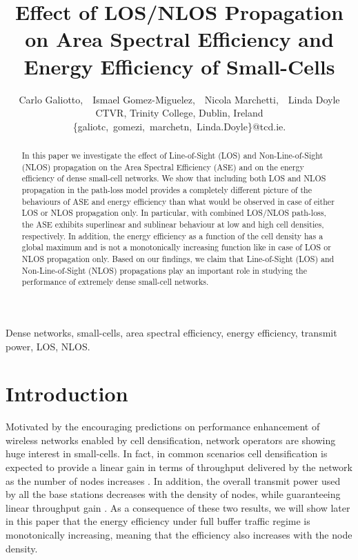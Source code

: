 \documentclass[twocoumn]{IEEEtran}
\title{Effect of LOS/NLOS Propagation on Area Spectral Efficiency and Energy Efficiency of Small-Cells}
\author{Carlo Galiotto,~~Ismael Gomez-Miguelez,~~Nicola Marchetti,~~Linda Doyle\\
CTVR, Trinity College, Dublin, Ireland \\ \{galiotc,~gomezi,~marchetn,~Linda.Doyle\}@tcd.ie.
}
\begin{document}
\maketitle
\begin{abstract}
In this paper we investigate the effect of Line-of-Sight (LOS) and Non-Line-of-Sight (NLOS) propagation on the Area Spectral Efficiency (ASE) and on the energy efficiency of dense small-cell networks.  
We show that including both LOS and NLOS propagation in the path-loss model provides a completely different picture of the behaviours of ASE and energy efficiency than what would be observed in case of either LOS or NLOS propagation only. In particular, with combined LOS/NLOS path-loss, the ASE exhibits superlinear and sublinear behaviour at low and high cell densities, respectively. In addition, the energy efficiency as a function of the cell density has a global maximum and is not a monotonically increasing function like in case of LOS or NLOS propagation only. Based on our findings, we claim that Line-of-Sight (LOS) and Non-Line-of-Sight (NLOS) propagations play an important role in studying the performance of extremely dense small-cell networks.
\end{abstract}

\begin{IEEEkeywords}
Dense networks, small-cells, area spectral efficiency, energy efficiency, transmit power, LOS, NLOS.
\end{IEEEkeywords}


\section{Introduction}

\label{sect:intro}

Motivated by the encouraging predictions on performance enhancement of wireless networks enabled by cell densification, network operators are showing huge interest in small-cells. In fact, in common scenarios cell densification is expected to provide a linear gain in terms of
throughput delivered by the network as the number of nodes increases
\cite{Andrews2011}. In addition, the overall transmit power used
by all the base stations decreases with the density of nodes, while
guaranteeing linear throughput gain \cite{Galiotto2013}. As a consequence of these two results, we will show later in this paper that the energy efficiency under full buffer traffic regime is monotonically increasing, meaning that the efficiency also increases with the node density. 
\end{document}
